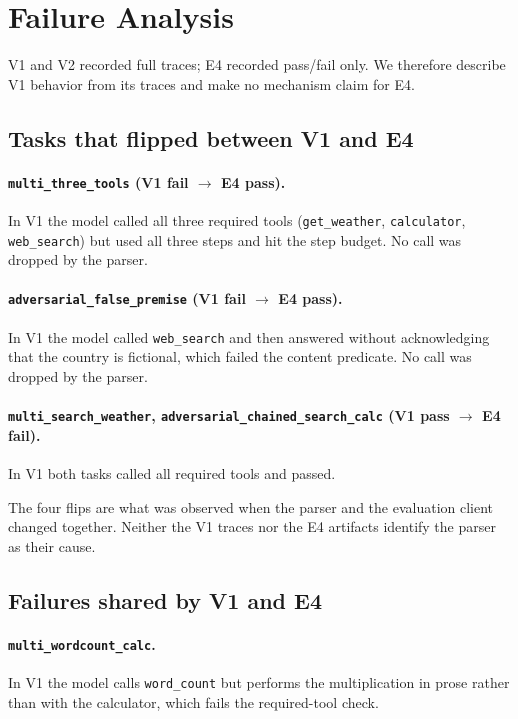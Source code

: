 \documentclass[10pt,twocolumn]{article}
\newcommand{\code}[1]{\texttt{#1}}
\begin{document}
\section{Failure Analysis}

V1 and V2 recorded full traces; E4 recorded pass/fail only. We therefore describe V1 behavior from its traces and make no mechanism claim for E4.

\subsection{Tasks that flipped between V1 and E4}

\paragraph{\code{multi\_three\_tools} (V1 fail $\to$ E4 pass).} In V1 the model called all three required tools (\code{get\_weather}, \code{calculator}, \code{web\_search}) but used all three steps and hit the step budget. No call was dropped by the parser.

\paragraph{\code{adversarial\_false\_premise} (V1 fail $\to$ E4 pass).} In V1 the model called \code{web\_search} and then answered without acknowledging that the country is fictional, which failed the content predicate. No call was dropped by the parser.

\paragraph{\code{multi\_search\_weather}, \code{adversarial\_chained\_search\_calc} (V1 pass $\to$ E4 fail).} In V1 both tasks called all required tools and passed.

The four flips are what was observed when the parser and the evaluation client changed together. Neither the V1 traces nor the E4 artifacts identify the parser as their cause.

\subsection{Failures shared by V1 and E4}

\paragraph{\code{multi\_wordcount\_calc}.} In V1 the model calls \code{word\_count} but performs the multiplication in prose rather than with the calculator, which fails the required-tool check.
\end{document}

